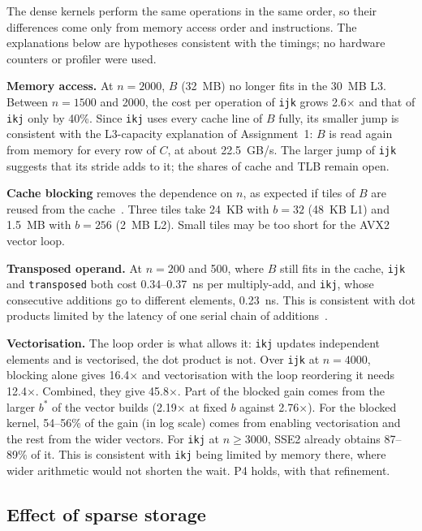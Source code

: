 \documentclass[11pt,a4paper]{article}
\begin{document}
The dense kernels perform the same operations in the same order, so their differences come
only from memory access order and instructions. The explanations below are hypotheses
consistent with the timings; no hardware counters or profiler were used.

\textbf{Memory access.} At $n = 2000$, $B$ (32~MB) no longer fits in the 30~MB L3. Between
$n = 1500$ and 2000, the cost per operation of \texttt{ijk} grows 2.6$\times$ and that of
\texttt{ikj} only by 40\%. Since \texttt{ikj} uses every cache line of $B$ fully, its smaller
jump is consistent with the L3-capacity explanation of Assignment~1: $B$ is read again from
memory for every row of $C$, at about 22.5~GB/s. The larger jump of \texttt{ijk} suggests
that its stride adds to it; the shares of cache and TLB remain open.

\textbf{Cache blocking} removes the dependence on $n$, as expected if tiles of $B$ are reused
from the cache~\cite{lam1991}. Three tiles take 24~KB with $b = 32$ (48~KB L1) and 1.5~MB
with $b = 256$ (2~MB L2). Small tiles may be too short for the AVX2 vector loop.

\textbf{Transposed operand.} At $n = 200$ and 500, where $B$ still fits in the cache,
\texttt{ijk} and \texttt{transposed} both cost 0.34--0.37~ns per multiply-add, and
\texttt{ikj}, whose consecutive additions go to different elements, 0.23~ns. This is
consistent with dot products limited by the latency of one serial chain of
additions~\cite{hennessy2019}.

\textbf{Vectorisation.} The loop order is what allows it: \texttt{ikj} updates independent
elements and is vectorised, the dot product is not. Over \texttt{ijk} at $n = 4000$, blocking
alone gives 16.4$\times$ and vectorisation with the loop reordering it needs 12.4$\times$.
Combined, they give 45.8$\times$. Part of the blocked gain comes from the larger $b^*$ of the
vector builds (2.19$\times$ at fixed $b$ against 2.76$\times$). For the blocked kernel,
54--56\% of the gain (in log scale) comes from enabling vectorisation and the rest from the
wider vectors. For \texttt{ikj} at $n \ge 3000$, SSE2 already obtains 87--89\% of it. This is
consistent with \texttt{ikj} being limited by memory there, where wider arithmetic would not
shorten the wait. P4 holds, with that refinement.

\subsection{Effect of sparse storage}
\end{document}
